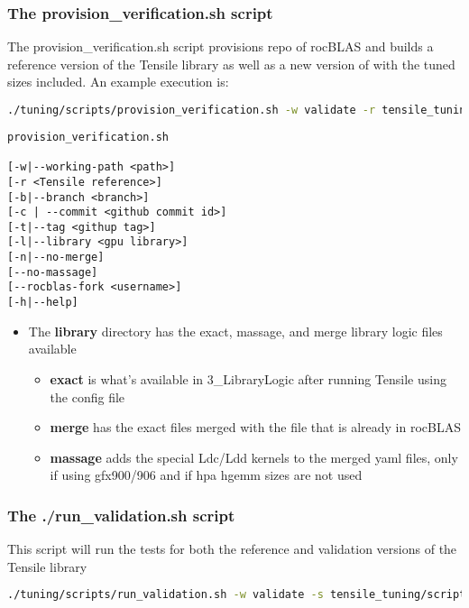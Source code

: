 \documentclass[]{article}
\begin{document}
\subsubsection{The provision\_verification.sh script}

The provision\_verification.sh script provisions repo of rocBLAS and builds a reference version of the Tensile library as well as a new version of with the tuned sizes included. An example execution is:

\begin{lstlisting}[language=bash,breaklines=true]
./tuning/scripts/provision_verification.sh -w validate -r tensile_tuning/tensile/Tensile -l vega20
\end{lstlisting}

\begin{verbatim}
provision_verification.sh 

[-w|--working-path <path>] 
[-r <Tensile reference>] 
[-b|--branch <branch>] 
[-c | --commit <github commit id>] 
[-t|--tag <githup tag>] 
[-l|--library <gpu library>] 
[-n|--no-merge] 
[--no-massage]  
[--rocblas-fork <username>] 
[-h|--help]
\end{verbatim}

\begin{itemize}
	\item The \textbf{library} directory has the exact, massage, and merge library logic files available
	
	\begin{itemize}
		\item \textbf{exact} is what's available in 3\_LibraryLogic after running Tensile using the config file
	    \item \textbf{merge} has the exact files merged with the file that is already in rocBLAS
	    \item \textbf{massage} adds the special Ldc/Ldd kernels to the merged yaml files, only if using gfx900/906 and if hpa hgemm sizes are not used
    \end{itemize}
\end{itemize}

\subsubsection{The ./run\_validation.sh script}

This script will run the tests for both the reference and validation versions of the Tensile library

\begin{lstlisting}[language=bash,breaklines=true]
./tuning/scripts/run_validation.sh -w validate -s tensile_tuning/scripts
\end{lstlisting}
\end{document}
